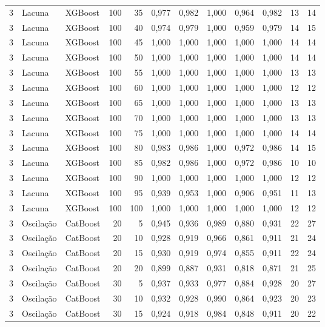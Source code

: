\begin{longtable}{@{}rllrrrrrrrrr@{}}
3 & Lacuna & XGBoost & 100 & 35 & 0,977 & 0,982 & 1,000 & 0,964 & 0,982 & 13 & 14 \\
3 & Lacuna & XGBoost & 100 & 40 & 0,974 & 0,979 & 1,000 & 0,959 & 0,979 & 14 & 15 \\
3 & Lacuna & XGBoost & 100 & 45 & 1,000 & 1,000 & 1,000 & 1,000 & 1,000 & 14 & 14 \\
3 & Lacuna & XGBoost & 100 & 50 & 1,000 & 1,000 & 1,000 & 1,000 & 1,000 & 14 & 14 \\
3 & Lacuna & XGBoost & 100 & 55 & 1,000 & 1,000 & 1,000 & 1,000 & 1,000 & 13 & 13 \\
3 & Lacuna & XGBoost & 100 & 60 & 1,000 & 1,000 & 1,000 & 1,000 & 1,000 & 12 & 12 \\
3 & Lacuna & XGBoost & 100 & 65 & 1,000 & 1,000 & 1,000 & 1,000 & 1,000 & 13 & 13 \\
3 & Lacuna & XGBoost & 100 & 70 & 1,000 & 1,000 & 1,000 & 1,000 & 1,000 & 13 & 13 \\
3 & Lacuna & XGBoost & 100 & 75 & 1,000 & 1,000 & 1,000 & 1,000 & 1,000 & 14 & 14 \\
3 & Lacuna & XGBoost & 100 & 80 & 0,983 & 0,986 & 1,000 & 0,972 & 0,986 & 14 & 15 \\
3 & Lacuna & XGBoost & 100 & 85 & 0,982 & 0,986 & 1,000 & 0,972 & 0,986 & 10 & 10 \\
3 & Lacuna & XGBoost & 100 & 90 & 1,000 & 1,000 & 1,000 & 1,000 & 1,000 & 12 & 12 \\
3 & Lacuna & XGBoost & 100 & 95 & 0,939 & 0,953 & 1,000 & 0,906 & 0,951 & 11 & 13 \\
3 & Lacuna & XGBoost & 100 & 100 & 1,000 & 1,000 & 1,000 & 1,000 & 1,000 & 12 & 12 \\
3 & Oscilação & CatBoost & 20 & 5 & 0,945 & 0,936 & 0,989 & 0,880 & 0,931 & 22 & 27 \\
3 & Oscilação & CatBoost & 20 & 10 & 0,928 & 0,919 & 0,966 & 0,861 & 0,911 & 21 & 24 \\
3 & Oscilação & CatBoost & 20 & 15 & 0,930 & 0,919 & 0,974 & 0,855 & 0,911 & 22 & 24 \\
3 & Oscilação & CatBoost & 20 & 20 & 0,899 & 0,887 & 0,931 & 0,818 & 0,871 & 21 & 25 \\
3 & Oscilação & CatBoost & 30 & 5 & 0,937 & 0,933 & 0,977 & 0,884 & 0,928 & 20 & 27 \\
3 & Oscilação & CatBoost & 30 & 10 & 0,932 & 0,928 & 0,990 & 0,864 & 0,923 & 20 & 23 \\
3 & Oscilação & CatBoost & 30 & 15 & 0,924 & 0,918 & 0,984 & 0,848 & 0,911 & 20 & 22 \\

\end{longtable}
